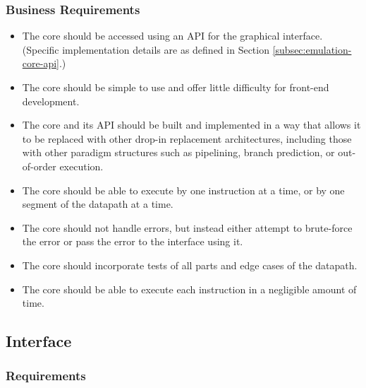 \documentclass[
    paper=letter,
    parskip=half,
    fontsize=12pt,
    titlepage=firstiscover,
    toc=bibliography,
    numbers=endperiod
]{scrartcl}
\begin{document}
\subsubsection{Business Requirements}
\begin{itemize}
    \item The core should be accessed using an API for the graphical interface.
          (Specific implementation details are as defined in Section
          \ref{subsec:emulation-core-api}.)
    \item The core should be simple to use and offer little difficulty for
          front-end development.
    \item The core and its API should be built and implemented in a way that
          allows it to be replaced with other drop-in replacement architectures,
          including those with other paradigm structures such as pipelining,
          branch prediction, or out-of-order execution.
    \item The core should be able to execute by one instruction at a time, or by
          one segment of the datapath at a time.
    \item The core should not handle errors, but instead either attempt to
          brute-force the error or pass the error to the interface using it.
    \item The core should incorporate tests of all parts and edge cases of the
          datapath.
    \item The core should be able to execute each instruction in a negligible
          amount of time.
\end{itemize}

\subsection{Interface}
\subsubsection{Requirements}
\end{document}
